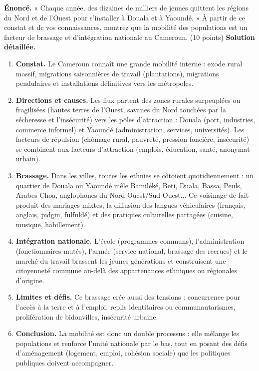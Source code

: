 \documentclass[11pt]{article}
\begin{document}
\begin{exoresolu}
\textbf{Énoncé.} « Chaque année, des dizaines de milliers de jeunes quittent les régions du Nord et de l'Ouest pour s'installer à Douala et à Yaoundé. » À partir de ce constat et de vos connaissances, montrez que la mobilité des populations est un facteur de brassage et d'intégration nationale au Cameroun. (10 points)
\tcblower
\textbf{Solution détaillée.}
\begin{enumerate}
\item \textbf{Constat.} Le Cameroun connaît une grande mobilité interne : exode rural massif, migrations saisonnières de travail (plantations), migrations pendulaires et installations définitives vers les métropoles.
\item \textbf{Directions et causes.} Les flux partent des zones rurales surpeuplées ou fragilisées (hautes terres de l'Ouest, savanes du Nord touchées par la sécheresse et l'insécurité) vers les pôles d'attraction : Douala (port, industries, commerce informel) et Yaoundé (administration, services, universités). Les facteurs de répulsion (chômage rural, pauvreté, pression foncière, insécurité) se combinent aux facteurs d'attraction (emplois, éducation, santé, anonymat urbain).
\item \textbf{Brassage.} Dans les villes, toutes les ethnies se côtoient quotidiennement : un quartier de Douala ou Yaoundé mêle Bamiléké, Beti, Duala, Bassa, Peuls, Arabes Choa, anglophones du Nord-Ouest/Sud-Ouest... Ce voisinage de fait produit des mariages mixtes, la diffusion des langues véhiculaires (français, anglais, pidgin, fulfuldé) et des pratiques culturelles partagées (cuisine, musique, habillement).
\item \textbf{Intégration nationale.} L'école (programmes communs), l'administration (fonctionnaires mutés), l'armée (service national, brassage des recrues) et le marché du travail brassent les jeunes générations et construisent une citoyenneté commune au-delà des appartenances ethniques ou régionales d'origine.
\item \textbf{Limites et défis.} Ce brassage crée aussi des tensions : concurrence pour l'accès à la terre et à l'emploi, replis identitaires ou communautarismes, prolifération de bidonvilles, insécurité urbaine.
\item \textbf{Conclusion.} La mobilité est donc un double processus : elle mélange les populations et renforce l'unité nationale par le bas, tout en posant des défis d'aménagement (logement, emploi, cohésion sociale) que les politiques publiques doivent accompagner.
\end{enumerate}
\end{exoresolu}
\end{document}
